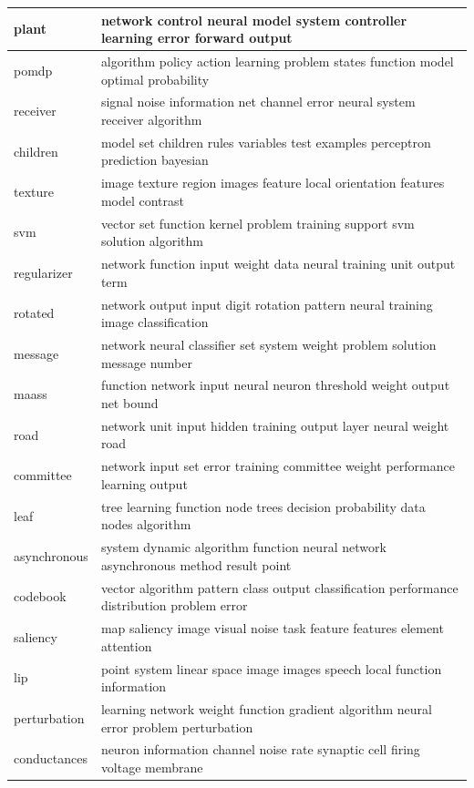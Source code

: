 \documentclass{article}
\begin{document}
\begin{tabular}{ l | l }
    plant & network control neural model system controller learning error forward output \\ \hline 
    pomdp & algorithm policy action learning problem states function model optimal probability \\ \hline 
    receiver & signal noise information net channel error neural system receiver algorithm \\ \hline 
    children & model set children rules variables test examples perceptron prediction bayesian \\ \hline 
    texture & image texture region images feature local orientation features model contrast \\ \hline 
    svm & vector set function kernel problem training support svm solution algorithm \\ \hline 
    regularizer & network function input weight data neural training unit output term \\ \hline 
    rotated & network output input digit rotation pattern neural training image classification \\ \hline 
    message & network neural classifier set system weight problem solution message number \\ \hline 
    maass & function network input neural neuron threshold weight output net bound \\ \hline 
    road & network unit input hidden training output layer neural weight road \\ \hline 
    committee & network input set error training committee weight performance learning output \\ \hline 
    leaf & tree learning function node trees decision probability data nodes algorithm \\ \hline 
    asynchronous & system dynamic algorithm function neural network asynchronous method result point \\ \hline 
    codebook & vector algorithm pattern class output classification performance distribution problem error \\ \hline 
    saliency & map saliency image visual noise task feature features element attention \\ \hline 
    lip & point system linear space image images speech local function information \\ \hline 
    perturbation & learning network weight function gradient algorithm neural error problem perturbation \\ \hline 
    conductances & neuron information channel noise rate synaptic cell firing voltage membrane \\ \hline 

\end{tabular}
\end{document}
